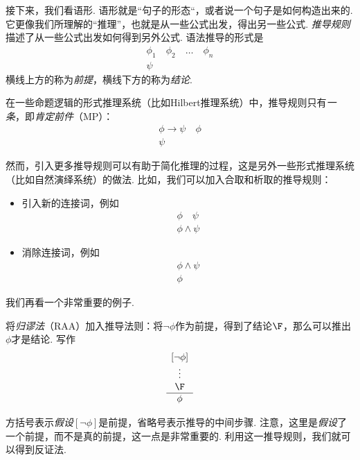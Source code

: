 接下来，我们看语形. 语形就是“句子的形态“，或者说一个句子是如何构造出来的. 它更像我们所理解的“推理”，也就是从一些公式出发，得出另一些公式. \emph{推导规则}描述了从一些公式出发如何得到另外公式. 语法推导的形式是
\[\begin{array}{c}
        \phi_1\quad\phi_2\quad\dots\quad\phi_n  \\\hline
        \psi
\end{array}\]
横线上方的称为\emph{前提}，横线下方的称为\emph{结论}. 

在一些命题逻辑的形式推理系统（比如Hilbert推理系统）中，推导规则只有\emph{一条}，即\emph{肯定前件}（MP）：
\[\begin{array}{c}
        \phi\to\psi\quad\phi  \\\hline
        \psi
\end{array}\]

然而，引入更多推导规则可以有助于简化推理的过程，这是另外一些形式推理系统（比如自然演绎系统）的做法. 比如，我们可以加入合取和析取的推导规则：
\begin{itemize}
    \item 引入新的连接词，例如
    \[\begin{array}{c}
         \phi\quad\psi  \\\hline
         \phi\wedge\psi
    \end{array}\]
    \item 消除连接词，例如
    \[\begin{array}{c}
        \phi\wedge\psi  \\\hline
        \phi
   \end{array}\]
\end{itemize}
    
我们再看一个非常重要的例子. 

\begin{example}
将\emph{归谬法}（RAA）加入推导法则：将$\neg\phi$作为前提，得到了结论$\F$，那么可以推出$\phi$才是结论. 写作
    \[\begin{array}{c}
         [\neg\phi]  \\
         \vdots\\
         \F\\\hline
         \phi
    \end{array}\]

方括号表示\emph{假设}$[\neg\phi]$是前提，省略号表示推导的中间步骤. 注意，这里是\emph{假设}了一个前提，而不是真的前提，这一点是非常重要的. 利用这一推导规则，我们就可以得到反证法. 
\end{example}



